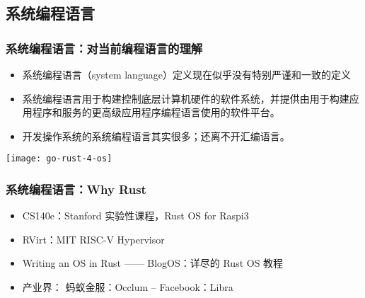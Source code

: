 \subsection{系统编程语言} %


\begin{frame}
	\frametitle{系统编程语言：\small{对当前编程语言的理解}}

	
	\begin{itemize}
		\item 系统编程语言（system language）定义现在似乎没有特别严谨和一致的定义
		\item 系统编程语言用于构建控制底层计算机硬件的软件系统，并提供由用于构建应用程序和服务的更高级应用程序编程语言使用的软件平台。
		\item 开发操作系统的系统编程语言其实很多；还离不开汇编语言。
	\end{itemize}
	\pause
	\centering
	\texttt{[image: go-rust-4-os]}
\end{frame}

\begin{frame}
	\frametitle{系统编程语言：\small{Why Rust}}
	
		
		\begin{itemize}
			\item CS140e：Stanford 实验性课程，Rust OS for Raspi3
			\item RVirt：MIT RISC-V Hypervisor
			\item Writing an OS in Rust —— BlogOS：详尽的 Rust OS 教程
			\item 产业界： 蚂蚁金服：Occlum  -- Facebook：Libra
		\end{itemize}

	
\end{frame}


